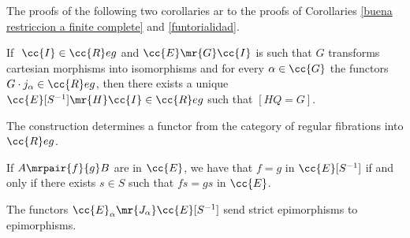 The proofs of the following two corollaries ar  to the proofs of Corollaries \ref{buena restriccion a finite complete} and \ref{funtorialidad}.


\begin{corollary} 
If $\ \cc{I} \in \cc{R}eg$ and ${\cc{E} \mr{G} \cc{I}}$ is such that $G$ transforms cartesian morphisms into isomorphisms and for every ${\alpha \in \cc{G}}$ the functors ${G \cdot j_\alpha \in \cc{R}eg}$, then there exists a unique ${\cc{E}[S^{-1}] \mr{H} \cc{I} \in \cc{R}eg}$ such that $[HQ=G]$.
\end{corollary}


\begin{corollary}
The construction determines a functor from the category of regular fibrations into $\cc{R}eg$.
\end{corollary}

\begin{observation}
If $A \mrpair{f}{g} B$  are in $\cc{E}$, we have that $f=g$ in $\cc{E}[S^{-1}]$ if and only if there exists $s \in S$ such that $fs=gs$ in $\cc{E}$. 
\end{observation}

\begin{proposition}\label{unicidad de la factorizacion}
The functors $\cc{E}_\alpha \mr{J_\alpha} \cc{E}[S^{-1}]$ send strict epimorphisms to epimorphisms.
\end{proposition}

